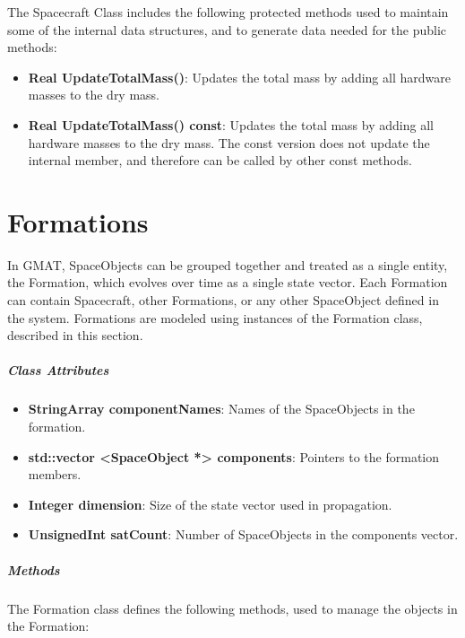 The Spacecraft Class includes the following protected methods used to maintain some of the internal
data structures, and to generate data needed for the public methods:

\begin{itemize}
\item \textbf{Real UpdateTotalMass()}: Updates the total mass by adding all hardware masses to the
dry mass.
\item \textbf{Real UpdateTotalMass() const}: Updates the total mass by adding all hardware masses to
the dry mass.  The const version does not update the internal member, and therefore can be called
by other const methods.
\end{itemize}

\section{Formations}

In GMAT, SpaceObjects can be grouped together and treated as a single entity, the Formation, which
evolves over time as a single state vector.  Each Formation can contain Spacecraft, other
Formations, or any other SpaceObject defined in the system.  Formations are modeled using instances
of the Formation class, described in this section.

\subparagraph{\textit{Class Attributes}}

\begin{itemize}
\item \textbf{StringArray componentNames}:  Names of the SpaceObjects in the formation.
\item \textbf{std::vector <SpaceObject *> components}:  Pointers to the formation members.
\item \textbf{Integer dimension}:  Size of the state vector used in propagation.
\item \textbf{UnsignedInt satCount}:  Number of SpaceObjects in the components vector.
\end{itemize}

\subparagraph{\textit{Methods}}

The Formation class defines the following methods, used to manage the objects in the Formation:

